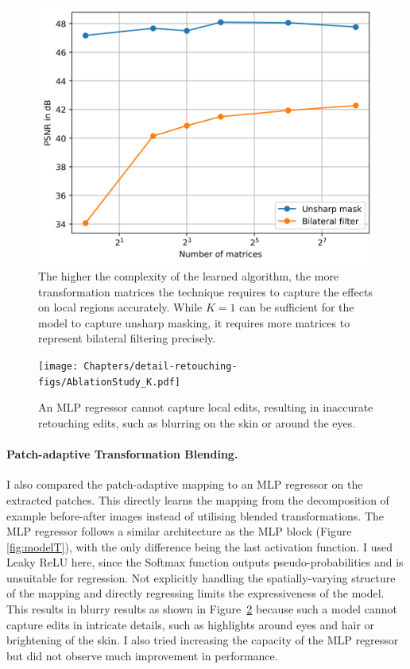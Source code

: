 \begin{figure}[th] %
    \centering
	\includegraphics[width=0.5\columnwidth]{Chapters/detail-retouching-figs/ablation_matrices.png}

    \caption{The higher the complexity of the learned algorithm, the more transformation matrices the technique requires to capture the effects on local regions accurately. While $K=1$ can be sufficient for the model to capture unsharp masking, it requires more matrices to represent bilateral filtering precisely.}

    \label{fig:ablation_K}
\end{figure}

\begin{figure}%
\centering
\texttt{[image: Chapters/detail-retouching-figs/AblationStudy\_K.pdf]}
    \caption{An MLP regressor cannot capture local edits, resulting in inaccurate retouching edits, such as blurring on the skin or around the eyes.}

\label{fig:ablation_MLP}
\end{figure}
\paragraph{Patch-adaptive Transformation Blending.} I also compared the patch-adaptive mapping to an MLP regressor on the extracted patches. This directly learns the mapping from the decomposition of example before-after images instead of utilising blended transformations. The MLP regressor follows a similar architecture as the MLP block (Figure \ref{fig:modelT}), with the only difference being the last activation function. I used Leaky ReLU here, since the Softmax function outputs pseudo-probabilities and is unsuitable for regression. Not explicitly handling the spatially-varying structure of the mapping and directly regressing limits the expressiveness of the model. This results in blurry results as shown in Figure~\ref{fig:ablation_MLP} because such a model cannot capture edits in intricate details, such as highlights around eyes and hair or brightening of the skin. I also tried increasing the capacity of the MLP regressor but did not observe much improvement in performance.


